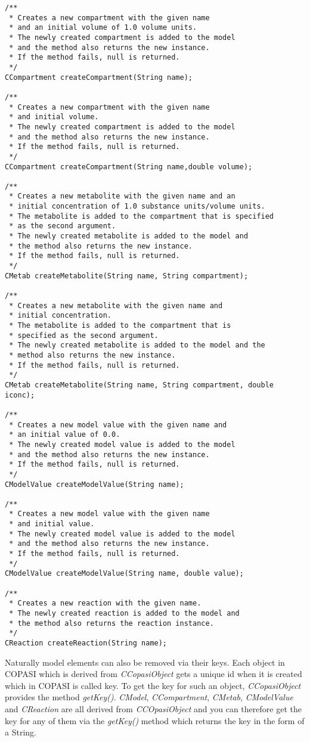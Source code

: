 \documentclass[a4,10pt]{article}
\begin{document}
\begin{lstlisting}
/**
 * Creates a new compartment with the given name 
 * and an initial volume of 1.0 volume units.
 * The newly created compartment is added to the model
 * and the method also returns the new instance.
 * If the method fails, null is returned.
 */
CCompartment createCompartment(String name);

/**
 * Creates a new compartment with the given name 
 * and initial volume.
 * The newly created compartment is added to the model
 * and the method also returns the new instance.
 * If the method fails, null is returned.
 */
CCompartment createCompartment(String name,double volume);

/**
 * Creates a new metabolite with the given name and an 
 * initial concentration of 1.0 substance units/volume units.
 * The metabolite is added to the compartment that is specified
 * as the second argument.
 * The newly created metabolite is added to the model and
 * the method also returns the new instance.
 * If the method fails, null is returned.
 */
CMetab createMetabolite(String name, String compartment);

/**
 * Creates a new metabolite with the given name and 
 * initial concentration.
 * The metabolite is added to the compartment that is 
 * specified as the second argument.
 * The newly created metabolite is added to the model and the
 * method also returns the new instance.
 * If the method fails, null is returned.
 */
CMetab createMetabolite(String name, String compartment, double iconc);

/**
 * Creates a new model value with the given name and 
 * an initial value of 0.0.
 * The newly created model value is added to the model
 * and the method also returns the new instance.
 * If the method fails, null is returned.
 */
CModelValue createModelValue(String name);

/**
 * Creates a new model value with the given name 
 * and initial value.
 * The newly created model value is added to the model
 * and the method also returns the new instance.
 * If the method fails, null is returned.
 */
CModelValue createModelValue(String name, double value);

/**
 * Creates a new reaction with the given name.
 * The newly created reaction is added to the model and 
 * the method also returns the reaction instance.
 */
CReaction createReaction(String name);
\end{lstlisting}

Naturally model elements can also be removed via their keys. Each object in COPASI which is derived from \textit{CCopasiObject} gets a unique id when it is created which in COPASI is called key. To get the key for such an object, \textit{CCopasiObject} provides the method \textit{getKey()}.
\textit{CModel}, \textit{CCompartment}, \textit{CMetab}, \textit{CModelValue} and \textit{CReaction} are all derived from \textit{CCOpasiObject} and you can therefore get the key for any of them via the \textit{getKey()} method which returns the key in the form of a String.
\end{document}
